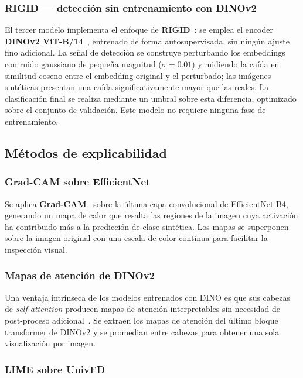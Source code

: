 \documentclass[12pt,a4paper,twoside]{article}
\begin{document}
\subsubsection{RIGID — detección sin entrenamiento con DINOv2}

El tercer modelo implementa el enfoque de \textbf{RIGID}~\cite{rigid2024}: se
emplea el encoder \textbf{DINOv2 ViT-B/14}~\cite{oquab2023dinov2}, entrenado de
forma autosupervisada, sin ningún ajuste fino adicional. La señal de detección se
construye perturbando los embeddings con ruido gaussiano de pequeña magnitud
($\sigma = 0.01$) y midiendo la caída en similitud coseno entre el embedding
original y el perturbado; las imágenes sintéticas presentan una caída
significativamente mayor que las reales. La clasificación final se realiza mediante
un umbral sobre esta diferencia, optimizado sobre el conjunto de validación. Este
modelo no requiere ninguna fase de entrenamiento.

\subsection{Métodos de explicabilidad}

\subsubsection{Grad-CAM sobre EfficientNet}

Se aplica \textbf{Grad-CAM}~\cite{selvaraju2017gradcam} sobre la última capa
convolucional de EfficientNet-B4, generando un mapa de calor que resalta las
regiones de la imagen cuya activación ha contribuido más a la predicción de clase
sintética. Los mapas se superponen sobre la imagen original con una escala de color
continua para facilitar la inspección visual.

\subsubsection{Mapas de atención de DINOv2}

Una ventaja intrínseca de los modelos entrenados con DINO es que sus cabezas de
\textit{self-attention} producen mapas de atención interpretables sin necesidad de
post-proceso adicional~\cite{caron2021dino}. Se extraen los mapas de atención del
último bloque transformer de DINOv2 y se promedian entre cabezas para obtener una
sola visualización por imagen.

\subsubsection{LIME sobre UnivFD}
\end{document}
